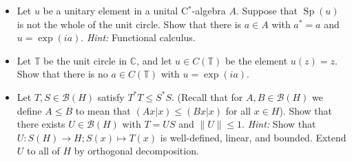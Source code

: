 \documentclass[twoside,12pt,a4paper]{article}
\newcommand{\Sp}{\operatorname{Sp}}
\newcommand{\mc}{\mathcal}
\begin{document}
\begin{itemize}
\item Let $u$ be a unitary element in a unital C$^*$-algebra $A$.
Suppose that $\Sp(u)$ is not the whole of the unit circle.  Show that
there is $a\in A$ with $a^*=a$ and $u = \exp(ia)$.
\emph{Hint:} Functional calculus.
\item Let $\mathbb T$ be the unit circle in $\mathbb C$, and let
$u\in C(\mathbb T)$ be the element $u(z)=z$.  Show that there is no
$a\in C(\mathbb T)$ with $u=\exp(ia)$.
\item Let $T,S\in\mc B(H)$ satisfy $T^*T \leq S^*S$.  (Recall that
for $A,B\in\mc B(H)$ we define $A\leq B$ to mean that $(Ax|x) \leq (Bx|x)$
for all $x\in H$).  Show that there exists $U\in\mc B(H)$ with
$T=US$ and $\|U\|\leq 1$.  \emph{Hint:} Show that $U:S(H)\rightarrow H;
S(x)\mapsto T(x)$ is well-defined, linear, and bounded.  Extend $U$ to
all of $H$ by orthogonal decomposition.
\end{itemize}
\end{document}
